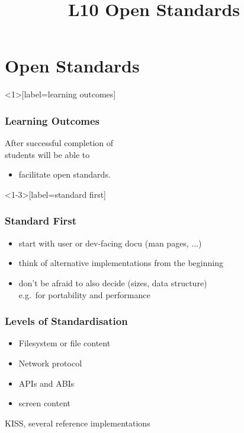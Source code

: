 

\title{L10 Open Standards}



\section{Open Standards}

\begin{frame}<1>[label=learning outcomes]
	\frametitle{Learning Outcomes}
	After successful completion of \inserttitle \\
	students will be able to

	\begin{itemize}
	\item facilitate open standards.
	\end{itemize}
\end{frame}

\begin{frame}<1-3>[label=standard first]
	\frametitle{Standard First}

	\begin{itemize}[<+-| alert@+>]
	\item start with user or dev-facing docu (man pages, ...)
	\item think of alternative implementations from the beginning
	\item don't be afraid to also decide (sizes, data structure) \\ e.g.\ for portability and performance
	\end{itemize}
\end{frame}

\begin{frame}
	\frametitle{Levels of Standardisation}

	\begin{itemize}[<+-| alert@+>]
	\item Filesystem or file content
	\item Network protocol
	\item APIs and ABIs
	\item screen content
	\end{itemize}

	\pause[\thebeamerpauses]  %

	\begin{finding}
	KISS, several reference implementations
	\end{finding}
\end{frame}

